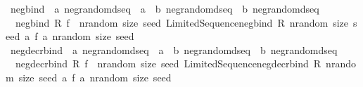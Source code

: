 \begin{isabellebody}
\isanewline
{}\isamarkupfalse%
\ neg{\isacharunderscore}{\kern0pt}bind\ {\isacharcolon}{\kern0pt}{\isacharcolon}{\kern0pt}\ {\isachardoublequoteopen}{\isacharprime}{\kern0pt}a\ neg{\isacharunderscore}{\kern0pt}random{\isacharunderscore}{\kern0pt}dseq\ {\isacharequal}{\kern0pt}{\isachargreater}{\kern0pt}\ {\isacharparenleft}{\kern0pt}{\isacharprime}{\kern0pt}a\ {\isasymRightarrow}\ {\isacharprime}{\kern0pt}b\ neg{\isacharunderscore}{\kern0pt}random{\isacharunderscore}{\kern0pt}dseq{\isacharparenright}{\kern0pt}\ {\isasymRightarrow}\ {\isacharprime}{\kern0pt}b\ neg{\isacharunderscore}{\kern0pt}random{\isacharunderscore}{\kern0pt}dseq{\isachardoublequoteclose}\isanewline
{}\isanewline
\ \ {\isachardoublequoteopen}neg{\isacharunderscore}{\kern0pt}bind\ R\ f\ {\isacharequal}{\kern0pt}\ {\isacharparenleft}{\kern0pt}{\isasymlambda}nrandom\ size\ seed{\isachardot}{\kern0pt}\ Limited{\isacharunderscore}{\kern0pt}Sequence{\isachardot}{\kern0pt}neg{\isacharunderscore}{\kern0pt}bind\ {\isacharparenleft}{\kern0pt}R\ nrandom\ size\ seed{\isacharparenright}{\kern0pt}\ {\isacharparenleft}{\kern0pt}{\isacharpercent}{\kern0pt}a{\isachardot}{\kern0pt}\ f\ a\ nrandom\ size\ seed{\isacharparenright}{\kern0pt}{\isacharparenright}{\kern0pt}{\isachardoublequoteclose}\isanewline
\isanewline
{}\isamarkupfalse%
\ neg{\isacharunderscore}{\kern0pt}decr{\isacharunderscore}{\kern0pt}bind\ {\isacharcolon}{\kern0pt}{\isacharcolon}{\kern0pt}\ {\isachardoublequoteopen}{\isacharprime}{\kern0pt}a\ neg{\isacharunderscore}{\kern0pt}random{\isacharunderscore}{\kern0pt}dseq\ {\isacharequal}{\kern0pt}{\isachargreater}{\kern0pt}\ {\isacharparenleft}{\kern0pt}{\isacharprime}{\kern0pt}a\ {\isasymRightarrow}\ {\isacharprime}{\kern0pt}b\ neg{\isacharunderscore}{\kern0pt}random{\isacharunderscore}{\kern0pt}dseq{\isacharparenright}{\kern0pt}\ {\isasymRightarrow}\ {\isacharprime}{\kern0pt}b\ neg{\isacharunderscore}{\kern0pt}random{\isacharunderscore}{\kern0pt}dseq{\isachardoublequoteclose}\isanewline
{}\isanewline
\ \ {\isachardoublequoteopen}neg{\isacharunderscore}{\kern0pt}decr{\isacharunderscore}{\kern0pt}bind\ R\ f\ {\isacharequal}{\kern0pt}\ {\isacharparenleft}{\kern0pt}{\isasymlambda}nrandom\ size\ seed{\isachardot}{\kern0pt}\ Limited{\isacharunderscore}{\kern0pt}Sequence{\isachardot}{\kern0pt}neg{\isacharunderscore}{\kern0pt}decr{\isacharunderscore}{\kern0pt}bind\ {\isacharparenleft}{\kern0pt}R\ nrandom\ size\ seed{\isacharparenright}{\kern0pt}\ {\isacharparenleft}{\kern0pt}{\isacharpercent}{\kern0pt}a{\isachardot}{\kern0pt}\ f\ a\ nrandom\ size\ seed{\isacharparenright}{\kern0pt}{\isacharparenright}{\kern0pt}{\isachardoublequoteclose}\isanewline

\end{isabellebody}
